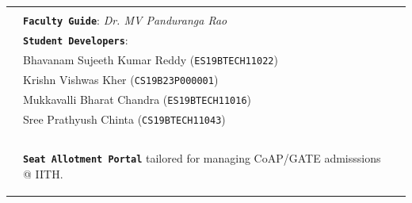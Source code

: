 \begin{center}
\begin{spacing}{1.7}
\begin{tabular}{p{4cm} ll}
& \\
& \large \textbf{\texttt{Faculty Guide}}: \textit{Dr. MV Panduranga Rao} \\
& \large \textbf{\texttt{Student Developers}}: \\
& \large Bhavanam Sujeeth Kumar Reddy (\texttt{ES19BTECH11022}) \\
& \large Krishn Vishwas Kher (\texttt{CS19B23P000001}) \\
& \large Mukkavalli Bharat Chandra (\texttt{ES19BTECH11016}) \\
& \large Sree Prathyush Chinta (\texttt{CS19BTECH11043}) \\
& \\
& \\
& \begin{tcolorbox}[colframe=white, colback=Apricot, arc=8pt, boxrule=4mm, boxsep=1mm] \textbf{\texttt{Seat Allotment Portal}} tailored for managing CoAP/GATE admisssions @ IITH.
\end{tcolorbox} \\ 
\end{tabular}
\end{spacing}
\end{center}



\thispagestyle{empty} %
\clearpage\setcounter{page}{1} %
